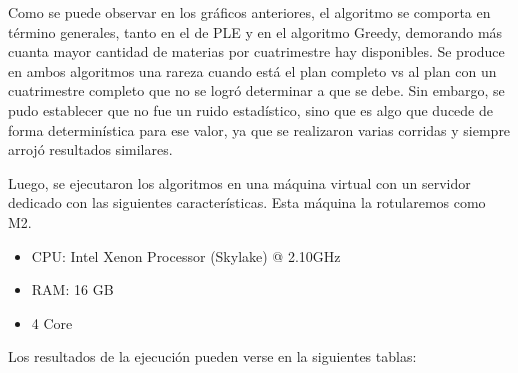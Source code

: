 \documentclass[a4paper]{article}
\begin{document}
Como se puede observar en los gráficos anteriores, el algoritmo se comporta en término generales, tanto en el de PLE y en el algoritmo Greedy, demorando más cuanta mayor cantidad de materias por cuatrimestre hay disponibles. Se produce en ambos algoritmos una rareza cuando está el plan completo vs al plan con un cuatrimestre completo que no se logró determinar a que se debe. Sin embargo, se pudo establecer que no fue un ruido estadístico, sino que es algo que ducede de forma determinística para ese valor, ya que se realizaron varias corridas y siempre arrojó resultados similares.

Luego, se ejecutaron los algoritmos en una máquina virtual con un servidor dedicado con las siguientes características. Esta máquina la rotularemos como M2.

\begin{itemize}
	\item CPU: Intel Xenon Processor (Skylake) @ 2.10GHz
	\item RAM: 16 GB
	\item 4 Core
\end{itemize}

Los resultados de la ejecución pueden verse en la siguientes tablas:
\end{document}
